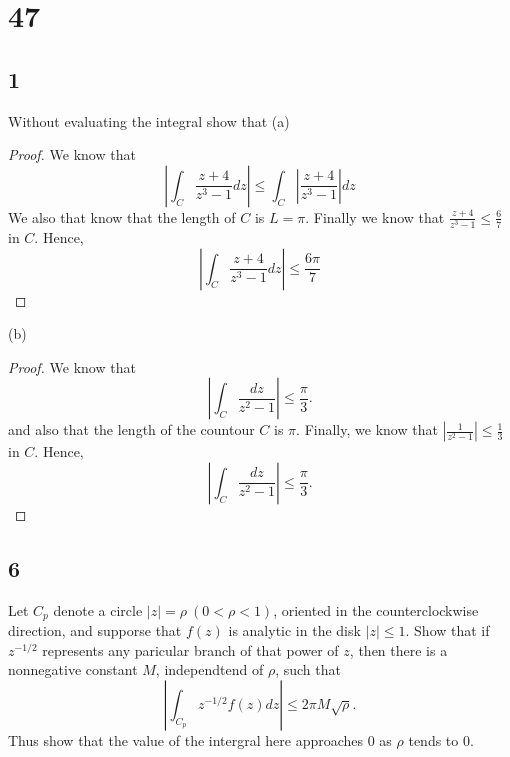 \documentclass{article}
\begin{document}
\section*{47}
\subsection*{1} %
Without evaluating the integral show that
(a)
\begin{proof}
    We know that
    $$\left | \int_C \frac{z + 4}{z^3 -1} dz \right | \leq \int_C \left | \frac{z + 4}{z^3 -1} \right | dz$$
    We also that know that the length of $C$ is $L = \pi$. Finally we know that
    $\frac{z+ 4}{z^3 -1} \leq \frac{6}{7}$ in $C$. Hence,
    $$\left | \int_C \frac{z + 4}{z^3 -1} dz \right | \leq \frac{6\pi}{7}$$
\end{proof}

(b)
\begin{proof}
    We know that
    $$\left | \int_C \frac{dz}{z^2 -1} \right | \leq \frac{\pi}{3}.$$
    and also that the length of the countour $C$ is $\pi$.
    Finally, we know that $\left | \frac{1}{z^2 -1} \right | \leq \frac{1}{3}$ in $C$.
    Hence,
    $$\left | \int_C \frac{dz}{z^2 -1} \right | \leq \frac{\pi}{3}.$$
\end{proof}

\subsection*{6} %
Let $C_p$ denote a circle $|z| = \rho \ (0 < \rho < 1)$, oriented in the counterclockwise
direction, and supporse that $f(z)$ is analytic in the disk $|z| \leq 1$. Show that
if $z^{-1/2}$ represents any paricular branch of that power of $z$, then there is a
nonnegative constant $M$, independtend of $\rho$, such that
$$\left | \int_{C_p} z^{-1/2}f(z) dz \right | \leq 2\pi M \sqrt{\rho}.$$
Thus show that the value of the intergral here approaches 0 as $\rho$ tends to $0$.
\end{document}
